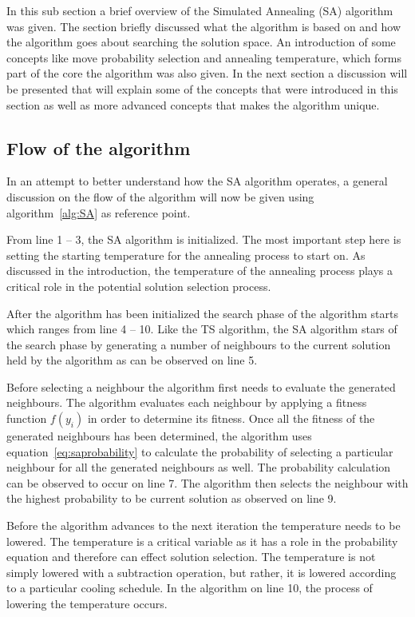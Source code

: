 In this sub section a brief overview of the Simulated Annealing (SA) algorithm was given. The section briefly discussed what the algorithm is based on and how the algorithm goes about searching the solution space. An introduction of some concepts like move probability selection and annealing temperature, which forms part of the core the algorithm was also given. In the next section a discussion will be presented that will explain some of the concepts that were introduced in this section as well as more advanced concepts that makes the algorithm unique.

\subsection{Flow of the algorithm}
In an attempt to better understand how the SA algorithm operates, a general discussion on the flow of the algorithm will now be given using algorithm~\ref{alg:SA} as reference point.

From line 1 -- 3, the SA algorithm is initialized. The most important step here is setting the starting temperature for the annealing process to start on. As discussed in the introduction, the temperature of the annealing process plays a critical role in the potential solution selection process.

After the algorithm has been initialized the search phase of the algorithm starts which ranges from line 4 -- 10. Like the TS algorithm, the SA algorithm stars of the search phase by generating a number of neighbours to the current solution held by the algorithm as can be observed on line 5.

Before selecting a neighbour the algorithm first needs to evaluate the generated neighbours. The algorithm evaluates each neighbour by applying a fitness function $f(y_i)$ in order to determine its fitness.
Once all the fitness of the generated neighbours has been determined, the algorithm uses equation~\ref{eq:saprobability} to calculate the probability of selecting a particular neighbour for all the generated neighbours as well. The probability calculation can be observed to occur on line 7. The algorithm then selects the neighbour with the highest probability to be current solution as observed on line 9. 

Before the algorithm advances to the next iteration the temperature needs to be lowered. The temperature is a critical variable as it has a role in the probability equation and therefore can effect solution selection. The temperature is not simply lowered with a subtraction operation, but rather, it is lowered according to a particular cooling schedule. In the algorithm on line 10, the process of lowering the temperature occurs.

